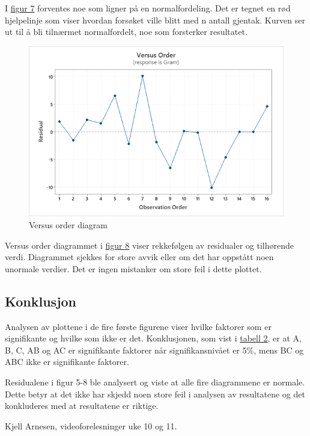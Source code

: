 \documentclass[12pt]{article}
\begin{document}
I \hyperref[fig:fig7]{figur 7} forventes noe som ligner på en normalfordeling. Det er tegnet en rød hjelpelinje som viser hvordan forsøket ville blitt med n antall gjentak. Kurven ser ut til å bli tilnærmet normalfordelt, noe som forsterker resultatet.\cite{1}  

\begin{figure}[H]
    \centering
    \includegraphics[width=\linewidth]{Figur 8.png}
    \caption{Versus order diagram}
    \label{fig:fig8}
\end{figure}

Versus order diagrammet i \hyperref[fig:fig8]{figur 8} viser rekkefølgen av residualer og tilhørende verdi. Diagrammet sjekkes for store avvik eller om det har oppstått noen unormale verdier. Det er ingen mistanker om store feil i dette plottet.\cite{1}


\clearpage
\subsection{Konklusjon}
Analysen av plottene i de fire første figurene viser hvilke faktorer som er signifikante og hvilke som ikke er det. Konklusjonen, som vist i \hyperref[tab:tabell2]{tabell 2}, er at A, B, C, AB og AC er signifikante faktorer når signifikansnivået er 5\%, mens BC og ABC ikke er signifikante faktorer. 

Residualene i figur 5-8 ble analysert og viste at alle fire diagrammene er normale. Dette betyr at det ikke har skjedd noen store feil i analysen av resultatene og det konkluderes med at resultatene er riktige.


\renewcommand\refname{Referanser}
\begin{thebibliography}{}
Kjell Arnesen, videoforelesninger uke 10 og 11.


\end{thebibliography}
\end{document}

